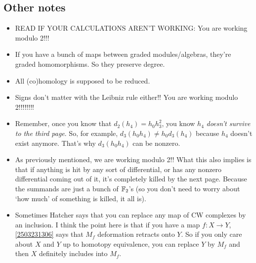 \documentclass{MetricNotes2023}
\def\bb{\ensuremath\mathbb}
\def\A{\ensuremath{\mathscr{A}_2}}
\begin{document}
\subsection{Other notes}\label{2503231313}

\begin{itemize}
\item READ IF YOUR CALCULATIONS AREN'T WORKING: You are working modulo 2!!!

\item If you have a bunch of maps between graded modules/algebras, they're graded homomorphisms. So they preserve degree. 

\item All (co)homology is supposed to be reduced.
\item Signs don't matter with the Leibniz rule either!! You are working modulo 2!!!!!!!!

\item Remember, once you know that \(d_2(h_4)=h_0h_3^2\), you know \(h_4\) \textit{doesn't survive to the third page}. So, for example, \(d_3(h_0h_4)\neq h_0d_3(h_4)\) because \(h_4\) doesn't exist anymore. That's why \(d_3(h_0h_4)\) can be nonzero. 

\item As previously mentioned, we are working modulo 2!! What this also implies is that if anything is hit by any sort of differential, or has any nonzero differential coming out of it, it's completely killed by the next page. Because the summands are just a bunch of \(\bb{F}_2\)'s (so you don't need to worry about `how much' of something is killed, it all is). 

\item Sometimes Hatcher says that you can replace any map of CW complexes by an inclusion. I think the point here is that if you have a map \(f : X \to Y\), \ref{2503231306} says that \(M_f\) deformation retracts onto \(Y\). So if you only care about \(X\) and \(Y\) up to homotopy equivalence, you can replace \(Y\) by \(M_f\) and then \(X\) definitely includes into \(M_f\). 


\end{itemize}
\end{document}
